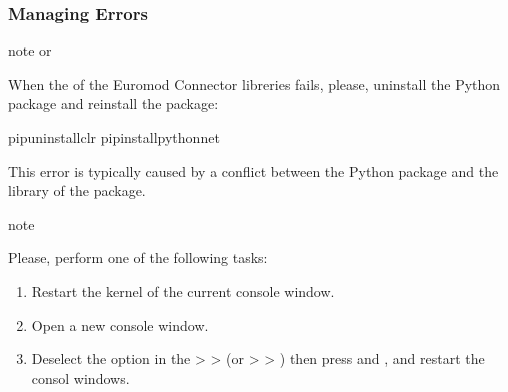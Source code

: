 \documentclass[letterpaper,10pt,english]{sphinxmanual}
\begin{document}
\subsubsection{Managing Errors}
\label{\detokenize{notebooks/userguide:managing-errors}}
\begin{sphinxadmonition}{note}{ or }

\sphinxAtStartPar
When the  of the Euromod Connector libreries fails, please, uninstall the Python  package and re\sphinxhyphen{}install the  package:
\end{sphinxadmonition}

\begin{sphinxVerbatim}[commandchars=\\\{\}]
\PYGZdl{}pipuninstallclr
\PYGZdl{}pipinstallpythonnet
\end{sphinxVerbatim}

\sphinxAtStartPar
This error is typically caused by a conflict between the Python  package and the  library of the  package.

\begin{sphinxadmonition}{note}{}

\sphinxAtStartPar
Please, perform one of the following tasks:
\begin{enumerate}
%
\item {} 
\sphinxAtStartPar
Restart the kernel of the current console window.

\item {} 
\sphinxAtStartPar
Open a new console window.

\item {} 
\sphinxAtStartPar
Deselect the option  in the \sphinxhyphen{}\textgreater{}  \sphinxhyphen{}\textgreater{}  (or  \sphinxhyphen{}\textgreater{}  \sphinxhyphen{}\textgreater{} ) then press  and , and restart the consol windows.

\end{enumerate}
\end{sphinxadmonition}
\end{document}
